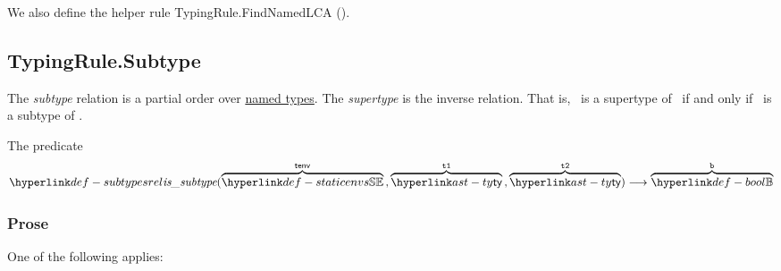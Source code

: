 We also define the helper rule TypingRule.FindNamedLCA ().

\subsection{TypingRule.Subtype\label{sec:TypingRule.Subtype}}
The \emph{subtype} relation is a partial order over \underline{named types}.
The \emph{supertype} is the inverse relation. That is, \tty\ is a supertype of \tsy\ if and only if \tsy\ is a subtype of \tty.

\hypertarget{def-subtypesrel}{}
The predicate
\[
  \subtypesrel(\overname{\staticenvs}{\tenv} \aslsep \overname{\ty}{\vtone} \aslsep \overname{\ty}{\vttwo})
  \aslto \overname{\Bool}{\vb}
\]

\subsubsection{Prose}
One of the following applies:
